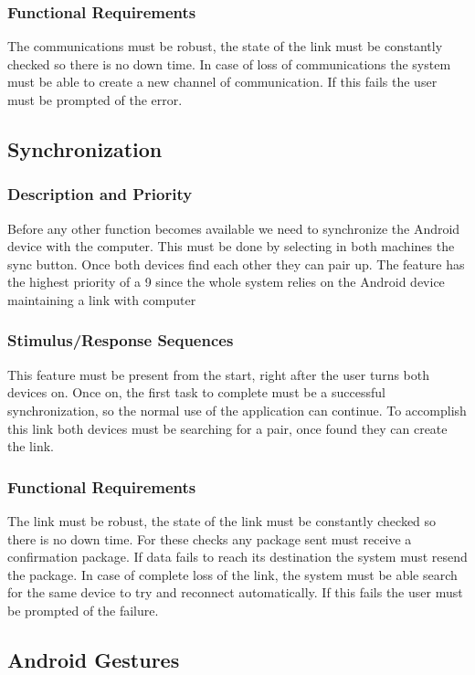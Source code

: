 \documentclass{article}
\begin{document}
\subsubsection{Functional Requirements}
The communications must be robust, the state of the link must be constantly checked so there is no down time. 
In case of loss of communications the system must be able to create a new channel of communication. 
If this fails the user must be prompted of the error.

\subsection{Synchronization}
\subsubsection{Description and Priority}
Before any other function becomes available we need to synchronize the Android device with the computer. 
This must be done by selecting in both machines the sync button. 
Once both devices find each other they can pair up. 
The feature has the highest priority of a 9 since the whole system relies on the Android device maintaining a link with computer
\subsubsection{Stimulus/Response Sequences}
This feature must be present from the start, right after the user turns both devices on. 
Once on, the first task to complete must be a successful synchronization, so the normal use of the application can continue. 
To accomplish this link both devices must be searching for a pair, once found they can create the link.
\subsubsection{Functional Requirements}
The link must be robust, the state of the link must be constantly checked so there is no down time. 
For these checks any package sent must receive a confirmation package. 
 If data fails to reach its destination the system must resend the package. 
In case of complete loss of the link, the system must be able search for the same device to try and reconnect automatically. 
If this fails the user must be prompted of the failure.

\subsection{Android Gestures}
\end{document}
